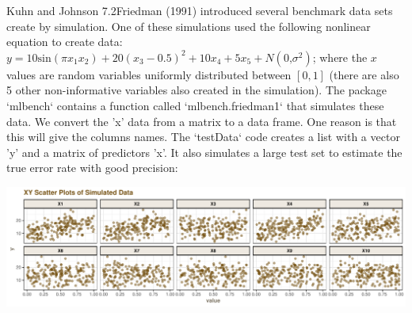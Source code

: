 \documentclass[]{report}
\newenvironment{Shaded}{\begin{snugshade}}{\end{snugshade}}
\newcommand{\CommentTok}[1]{\textcolor[rgb]{0.56,0.35,0.01}{\textit{#1}}}
\newcommand{\DataTypeTok}[1]{\textcolor[rgb]{0.13,0.29,0.53}{#1}}
\newcommand{\DecValTok}[1]{\textcolor[rgb]{0.00,0.00,0.81}{#1}}
\newcommand{\KeywordTok}[1]{\textcolor[rgb]{0.13,0.29,0.53}{\textbf{#1}}}
\newcommand{\NormalTok}[1]{#1}
\newcommand{\OperatorTok}[1]{\textcolor[rgb]{0.81,0.36,0.00}{\textbf{#1}}}
\newcommand{\StringTok}[1]{\textcolor[rgb]{0.31,0.60,0.02}{#1}}
\begin{document}

\begin{question}{Kuhn and Johnson 7.2}Friedman (1991) introduced several benchmark data sets create by simulation. One of these simulations used the following nonlinear equation to create data: $y = 10\text{sin}(\pi x_1 x_2)+20(x_3-0.5)^2+10x_4+5x_5+N(0\text{,} \sigma^2)$; where the $x$ values are random variables uniformly distributed between $[0, 1]$ (there are also 5 other non-informative variables also created in the simulation). 
\newline
The package `mlbench` contains a function called `mlbench.friedman1` that simulates these data. We convert the 'x' data from a matrix to a data frame. One reason is that this will give the columns names. The `testData` code creates a list with a vector 'y' and a matrix of predictors 'x'. It also simulates a large test set to estimate the true error rate with good precision: \end{question}

\begin{Shaded}
\end{Shaded}

\includegraphics{Homework-Two_files/figure-latex/kj-7.2-ex3-1.pdf}
\end{document}
